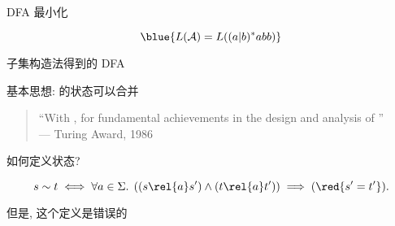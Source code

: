 
\begin{frame}{}

  \vspace{0.30cm}
  \begin{center}
    DFA 最小化
  \end{center}
\end{frame}

\begin{frame}{}

  \[
    \blue{L(\mathcal{A}) = L((a|b)^{\ast}abb)}
  \]


  \begin{center}
    子集构造法得到的 DFA
  \end{center}
\end{frame}

\begin{frame}{}
  \begin{center}
    基本思想: 的状态可以合并

    \vspace{0.30cm}

    \vspace{0.30cm}
    \begin{quote}
      \centering
      ``With , for fundamental achievements in the design and analysis
      of '' \\
      \hfill --- Turing Award, 1986
    \end{quote}
  \end{center}
\end{frame}

\begin{frame}{}
  \begin{center}
    如何定义状态?


    \[
      s \sim t \iff \forall a \in \Sigma.\;
        \left((s \rel{a} s') \land (t \rel{a} t')\right) \implies (\red{s' = t'}).
    \]

    \pause
    但是, 这个定义是错误的
  \end{center}
\end{frame}

